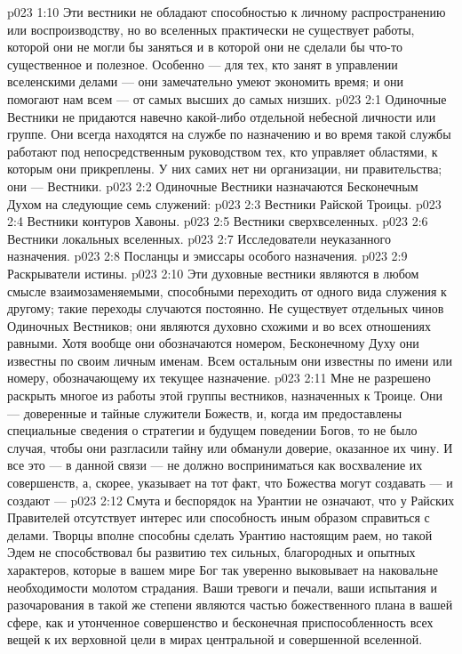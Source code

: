 \vs p023 1:10 \pc Эти вестники не обладают способностью к личному распространению или воспроизводству, но во вселенных практически не существует работы, которой они не могли бы заняться и в которой они не сделали бы что\hyp{}то существенное и полезное. Особенно --- для тех, кто занят в управлении вселенскими делами --- они замечательно умеют экономить время; и они помогают нам всем --- от самых высших до самых низших.
\vs p023 2:1 Одиночные Вестники не придаются навечно какой\hyp{}либо отдельной небесной личности или группе. Они всегда находятся на службе по назначению и во время такой службы работают под непосредственным руководством тех, кто управляет областями, к которым они прикреплены. У них самих нет ни организации, ни правительства; они ---  Вестники.
\vs p023 2:2 \pc Одиночные Вестники назначаются Бесконечным Духом на следующие семь служений:
\vs p023 2:3 \bibnobreakspace Вестники Райской Троицы.
\vs p023 2:4 \bibnobreakspace Вестники контуров Хавоны.
\vs p023 2:5 \bibnobreakspace Вестники сверхвселенных.
\vs p023 2:6 \bibnobreakspace Вестники локальных вселенных.
\vs p023 2:7 \bibnobreakspace Исследователи неуказанного назначения.
\vs p023 2:8 \bibnobreakspace Посланцы и эмиссары особого назначения.
\vs p023 2:9 \bibnobreakspace Раскрыватели истины.
\vs p023 2:10 \pc Эти духовные вестники являются в любом смысле взаимозаменяемыми, способными переходить от одного вида служения к другому; такие переходы случаются постоянно. Не существует отдельных чинов Одиночных Вестников; они являются духовно схожими и во всех отношениях равными. Хотя вообще они обозначаются номером, Бесконечному Духу они известны по своим личным именам. Всем остальным они известны по имени или номеру, обозначающему их текущее назначение.
\vs p023 2:11 \bibnobreakspace {} Мне не разрешено раскрыть многое из работы этой группы вестников, назначенных к Троице. Они --- доверенные и тайные служители Божеств, и, когда им предоставлены специальные сведения о стратегии и будущем поведении Богов, то не было случая, чтобы они разгласили тайну или обманули доверие, оказанное их чину. И все это --- в данной связи --- не должно восприниматься как восхваление их совершенств, а, скорее, указывает на тот факт, что Божества могут создавать --- и создают --- 
\vs p023 2:12 Смута и беспорядок на Урантии не означают, что у Райских Правителей отсутствует интерес или способность иным образом справиться с делами. Творцы вполне способны сделать Урантию настоящим раем, но такой Эдем не способствовал бы развитию тех сильных, благородных и опытных характеров, которые в вашем мире Бог так уверенно выковывает на наковальне необходимости молотом страдания. Ваши тревоги и печали, ваши испытания и разочарования в такой же степени являются частью божественного плана в вашей сфере, как и утонченное совершенство и бесконечная приспособленность всех вещей к их верховной цели в мирах центральной и совершенной вселенной.
